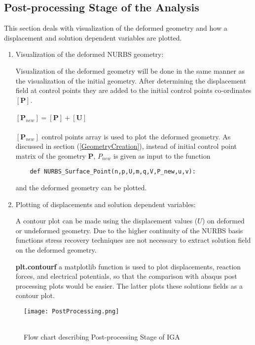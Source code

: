 \documentclass[11pt]{article}
\begin{document}
\subsection{Post-processing Stage of the Analysis}
This section deals with visualization of the deformed geometry and how a
displacement and solution dependent variables are plotted. 

\begin{enumerate}[leftmargin=*]
	\item Visualization of the deformed NURBS geometry:
	
	Visualization of the deformed geometry will be done in the same manner as the
	visualization of the initial geometry. After determining the displacement field
	at control points they are added to the initial control points co-ordinates
	$[\textbf{P}]$.\\
	\\
	$[\textbf{P}_{new}]=[\textbf{P}]+[\textbf{U}]$ \\
	\\
	$[\textbf{P}_{new}]$ control points array is used to plot the deformed
	geometry.
	As discussed in section (\ref{GeometryCreation}), instead of initial control point matrix of the geometry \textbf{P}, \textbf{$P_{new}$} is given as input to the function 
	\begin{verbatim}
	def NURBS_Surface_Point(n,p,U,m,q,V,P_new,u,v):
	\end{verbatim}
	and the deformed geometry can be plotted.
	 
	
	\item Plotting of displacements and solution dependent variables:
	
	A contour plot can be made using the displacement values ($U$) on deformed or undeformed geometry.
	Due to the higher continuity of the NURBS basis functions stress recovery techniques are not necessary to extract solution field on the deformed geometry.  
	
	\textbf{plt.contourf} a matplotlib function is used to plot displacements, reaction forces, and electrical potentials, so that the comparison with abaqus post processing plots would be easier. The latter plots these solutions fields as a contour plot.
	
\end{enumerate}

\begin{figure}[H]
	\begin{center}
		\texttt{[image: PostProcessing.png]} 
		\caption{\\Flow chart describing Post-processing Stage of IGA}\label{PostProcessing}
	\end{center}
	
\end{figure}
\end{document}
